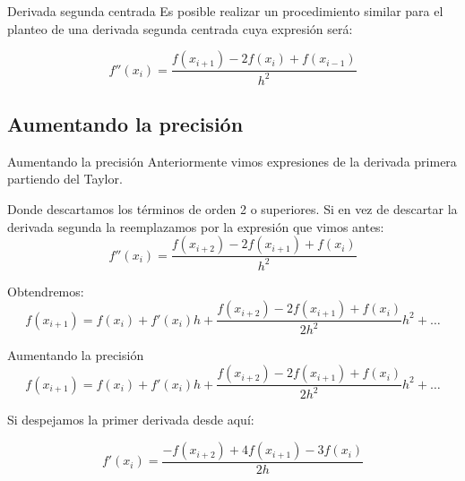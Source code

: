 \documentclass[xcolor=svgnames]{beamer} %
\theoremstyle{plain}
\theoremstyle{definition}
\begin{document}
\begin{frame}{Derivada segunda centrada}
Es posible realizar un procedimiento similar para el planteo de una derivada segunda centrada cuya expresión será:\vspace{20pt}

\begin{tcolorbox}
  $$ f''(x_i) = \frac{f(x_{i+1}) -2f(x_{i})+f(x_{i-1})}{h^2}$$

\end{tcolorbox}
\end{frame}


\subsection{Aumentando la precisión}

\begin{frame}{Aumentando la precisión}
	Anteriormente vimos expresiones de la derivada primera partiendo del Taylor.\pause
	
 Donde descartamos los términos de orden 2 o superiores. Si en vez de descartar la derivada segunda la reemplazamos por la expresión que vimos antes:
  $$ f''(x_i) = \frac{f(x_{i+2}) -2f(x_{i+1})+f(x_{i})}{h^2}$$
 
  Obtendremos:
  $$f(x_{i+1}) = f(x_i) + f'(x_i) h + \frac{f(x_{i+2}) -2f(x_{i+1})+f(x_{i})}{2h^2} h^2 + \dots $$
  
  	 
\end{frame}


\begin{frame}{Aumentando la precisión}
  $$f(x_{i+1}) = f(x_i) + f'(x_i) h + \frac{f(x_{i+2}) -2f(x_{i+1})+f(x_{i})}{2h^2} h^2 + \dots $$
  
  Si despejamos la primer derivada desde aquí:\vspace{15pt} \pause
  \begin{tcolorbox}  
  
  $$ f'(x_i) = \frac{-f(x_{i+2}) +4f(x_{i+1})-3f(x_{i})}{2h} $$
  \end{tcolorbox}  
  
  
\end{frame}
\end{document}

